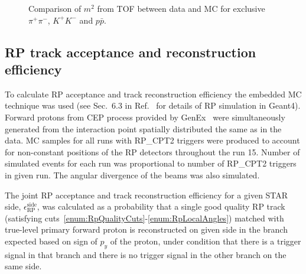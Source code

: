 \begin{figure}[ht!]
{  \begin{subfigure}[b]{\linewidth}{
                }
  \end{subfigure}
}%
\caption{Comparison of $m^{2}$ from TOF between data and MC for exclusive $\pi^{+}\pi^{-}$, $K^{+}K^{-}$ and $p\bar{p}$.}
\end{figure}









\subsection{RP track acceptance and reconstruction efficiency}\label{sec:rpAccAndEff}

To calculate RP acceptance and track reconstruction efficiency the embedded MC technique was used (see Sec.~6.3 in Ref.~\cite{supplementaryNote} for details of RP simulation in Geant4). Forward protons from CEP process provided by GenEx~\cite{GenEx} were simultaneously generated from the interaction point spatially distributed the same as in the data. MC samples for all runs with RP\_CPT2 triggers were produced to account for non-constant positions of the RP detectors throughout the run 15. Number of simulated events for each run was proportional to number of RP\_CPT2 triggers in given run. The angular divergence of the beams was also simulated.

The joint RP acceptance and track reconstruction efficiency for a given STAR side, $\epsilon_{\text{RP}}^{\text{side}}$, was calculated as a probability that a single good quality RP track (satisfying cuts~\ref{enum:RpQualityCuts}-\ref{enum:RpLocalAngles}) matched with true-level primary forward proton is reconstructed on given side in the branch expected based on sign of $p_{y}$ of the proton, under condition that there is a trigger signal in that branch and there is no trigger signal in the other branch on the same side.

